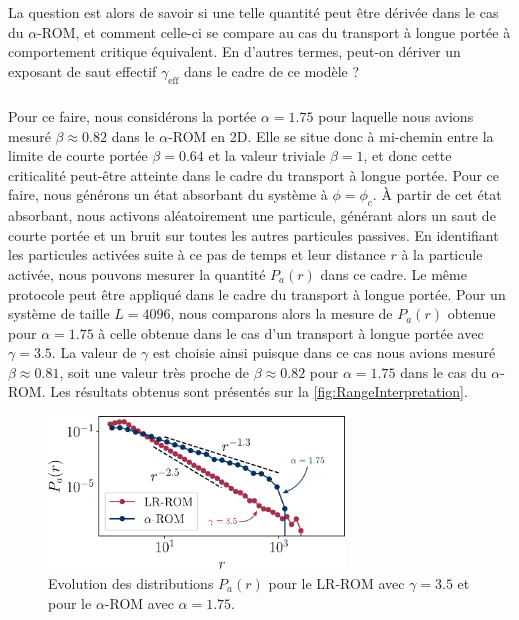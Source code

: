 \noindent La question est alors de savoir si une telle quantité peut être dérivée dans le cas du $\alpha$-ROM, et comment celle-ci se compare au cas du transport à longue portée à comportement critique équivalent. En d'autres termes, peut-on dériver un exposant de saut effectif $\gamma_\text{eff}$ dans le cadre de ce modèle ? 

\subparagraph{}Pour ce faire, nous considérons la portée $\alpha = 1.75$ pour laquelle nous avions mesuré $\beta\approx 0.82$ dans le $\alpha$-ROM en 2D. Elle se situe donc à mi-chemin entre la limite de courte portée $\beta = 0.64$ et la valeur triviale $\beta = 1$, et donc cette criticalité peut-être atteinte dans le cadre du transport à longue portée. Pour ce faire, nous générons un état absorbant du système à $\phi = \phi_c$. \`A partir de cet état absorbant, nous activons aléatoirement une particule, générant alors un saut de courte portée et un bruit sur toutes les autres particules passives. En identifiant les particules activées suite à ce pas de temps et leur distance $r$ à la particule activée, nous pouvons mesurer la quantité $P_a(r)$ dans ce cadre. Le même protocole peut être appliqué dans le cadre du transport à longue portée. Pour un système de taille $L=4096$, nous comparons alors la mesure de $P_a(r)$ obtenue pour $\alpha = 1.75$ à celle obtenue dans le cas d'un transport à longue portée avec $\gamma = 3.5$. La valeur de $\gamma$ est choisie ainsi puisque dans ce cas nous avions mesuré $\beta \approx 0.81$, soit une valeur très proche de $\beta\approx 0.82$ pour $\alpha = 1.75$ dans le cas du $\alpha$-ROM. Les résultats obtenus sont présentés sur la \autoref{fig:RangeInterpretation}.

\begin{figure}[h]
	\centering
	\includegraphics[width=0.7\textwidth]{Chapitre3/Figures/Interpretation/RangeInterpretation.pdf}
	\caption{Evolution des distributions $P_a(r)$ pour le LR-ROM avec $\gamma = 3.5$ et pour le $\alpha$-ROM avec $\alpha = 1.75$. }
	\label{fig:RangeInterpretation}
\end{figure}

